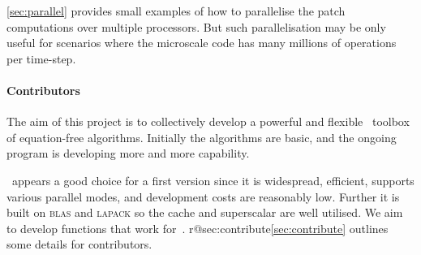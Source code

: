 \cref{sec:parallel} provides small examples of how to parallelise the patch computations over multiple processors.  
But such parallelisation may be only useful for scenarios where the microscale code has many millions of operations per time-step.



\paragraph{Contributors}
The aim of this project is to collectively develop a powerful and flexible \script\ toolbox of equation-free algorithms.
Initially the algorithms are basic, and the ongoing program is developing more and more capability.

\Matlab\ appears a good choice for a first version since it is widespread, efficient, supports various parallel modes, and development costs are reasonably low.
Further it is built on \textsc{blas} and \textsc{lapack} so the cache and superscalar \cpu{} are well utilised.
We aim to develop functions that work for~\script.
\ifcsname r@sec:contribute\endcsname\cref{sec:contribute} outlines some details for contributors.\fi



